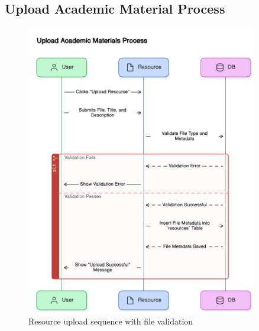 \subsection{Upload Academic Material Process}
\begin{figure}[H]
    \centering
    \includegraphics[width=0.9\textwidth]{latex-doc/images/sequence_diagrams/upload_academic_material_process.png}
    \caption{Resource upload sequence with file validation}
    \label{fig:upload_material}
\end{figure}

